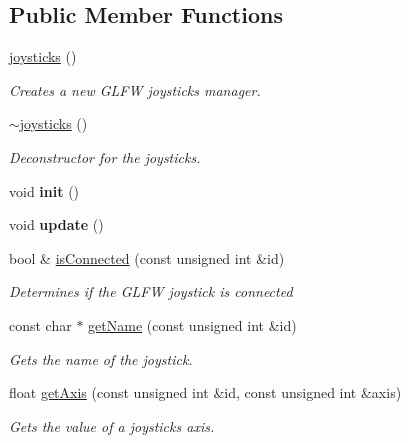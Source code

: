 \subsection*{Public Member Functions}
\begin{DoxyCompactItemize}
\item 
\hyperlink{classflounder_1_1joysticks_ad0676c90afa28b4fb69de64c253e9c34}{joysticks} ()
\begin{DoxyCompactList}\small\item\em Creates a new G\+L\+FW joysticks manager. \end{DoxyCompactList}\item 
\hyperlink{classflounder_1_1joysticks_aaab9cf61c7c5d6736742347c7c657ed8}{$\sim$joysticks} ()
\begin{DoxyCompactList}\small\item\em Deconstructor for the joysticks. \end{DoxyCompactList}\item 
\mbox{\label{classflounder_1_1joysticks_ac98a891411d807778b02dff4c75b8076}} 
void {\bfseries init} ()
\item 
\mbox{\label{classflounder_1_1joysticks_a74e678ca314b29af7584e7d1e43eef94}} 
void {\bfseries update} ()
\item 
bool \& \hyperlink{classflounder_1_1joysticks_ad6309541a3d177f9d37c941f8cc09c62}{is\+Connected} (const unsigned int \&id)
\begin{DoxyCompactList}\small\item\em Determines if the G\+L\+FW joystick is connected \end{DoxyCompactList}\item 
const char $\ast$ \hyperlink{classflounder_1_1joysticks_a41c18546c939fc33a563ecc6b920d9dc}{get\+Name} (const unsigned int \&id)
\begin{DoxyCompactList}\small\item\em Gets the name of the joystick. \end{DoxyCompactList}\item 
float \hyperlink{classflounder_1_1joysticks_a992bbe1f8a516d685a0e00867bdb6929}{get\+Axis} (const unsigned int \&id, const unsigned int \&axis)
\begin{DoxyCompactList}\small\item\em Gets the value of a joysticks axis. \end{DoxyCompactList}\item 

\end{DoxyCompactItemize}
